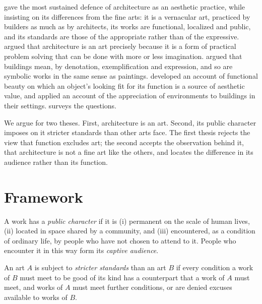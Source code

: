 \documentclass{situationist-preprint}
\begin{document}
\citet{Scruton1979} gave the most sustained defence of architecture as an aesthetic practice, while insisting on its differences from the fine arts: it is a vernacular art, practiced by builders as much as by architects, its works are functional, localized and public, and its standards are those of the appropriate rather than of the expressive. \citet{Graham1989} argued that architecture is an art precisely because it is a form of practical problem solving that can be done with more or less imagination. \citet{Goodman1985} argued that buildings mean, by denotation, exemplification and expression, and so are symbolic works in the same sense as paintings. \citet{ParsonsCarlson2008} developed an account of functional beauty on which an object's looking fit for its function is a source of aesthetic value, and \citet{Carlson2000} applied an account of the appreciation of environments to buildings in their settings. \citet{Winters2007} surveys the questions.

We argue for two theses. First, architecture is an art. Second, its public character imposes on it stricter standards than other arts face. The first thesis rejects the view that function excludes art; the second accepts the observation behind it, that architecture is not a fine art like the others, and locates the difference in its audience rather than its function.

\section{Framework}

\begin{definition}\label{d:public}
A work has a \emph{public character} if it is (i) permanent on the scale of human lives, (ii) located in space shared by a community, and (iii) encountered, as a condition of ordinary life, by people who have not chosen to attend to it. People who encounter it in this way form its \emph{captive audience}.
\end{definition}

\begin{definition}\label{d:strict}
An art $A$ is subject to \emph{stricter standards} than an art $B$ if every condition a work of $B$ must meet to be good of its kind has a counterpart that a work of $A$ must meet, and works of $A$ must meet further conditions, or are denied excuses available to works of $B$.
\end{definition}
\end{document}
